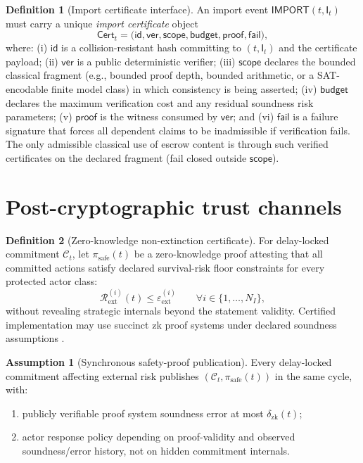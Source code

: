 \documentclass[11pt,a4paper]{article}
\newcommand{\eps}{\varepsilon}
\theoremstyle{definition}
\newtheorem{definition}{Definition}
\newtheorem{assumption}{Assumption}
\theoremstyle{remark}
\begin{document}
\begin{definition}[Import certificate interface]\label{def:import_certificate_interface}
An import event $\mathsf{IMPORT}(t,\mathsf I_t)$ must carry a unique \emph{import certificate} object
\[
\mathsf{Cert}_{t}=\big(\mathsf{id},\mathsf{ver},\mathsf{scope},\mathsf{budget},\mathsf{proof},\mathsf{fail}\big),
\]
where:
(i) $\mathsf{id}$ is a collision-resistant hash committing to $(t,\mathsf I_t)$ and the certificate payload;
(ii) $\mathsf{ver}$ is a public deterministic verifier;
(iii) $\mathsf{scope}$ declares the bounded classical fragment (e.g., bounded proof depth, bounded arithmetic, or a SAT-encodable finite model class) in which consistency is being asserted;
(iv) $\mathsf{budget}$ declares the maximum verification cost and any residual soundness risk parameters;
(v) $\mathsf{proof}$ is the witness consumed by $\mathsf{ver}$; and
(vi) $\mathsf{fail}$ is a failure signature that forces all dependent claims to be inadmissible if verification fails.
The only admissible classical use of escrow content is through such verified certificates on the declared fragment (fail closed outside $\mathsf{scope}$).
\end{definition}

\section{Post-cryptographic trust channels}
\begin{definition}[Zero-knowledge non-extinction certificate]\label{def:zero_knowledge_non_extinction_certificate}
For delay-locked commitment $\mathcal C_t$, let $\pi_{\mathrm{safe}}(t)$ be a zero-knowledge proof attesting that all committed actions satisfy declared survival-risk floor constraints for every protected actor class:
\[
\mathcal R_{\mathrm{ext}}^{(i)}(t)\le \eps_{\mathrm{ext}}^{(i)}\qquad \forall i\in\{1,\dots,N_I\},
\]
without revealing strategic internals beyond the statement validity.
Certified implementation may use succinct zk proof systems under declared soundness assumptions \cite{Groth2016}.
\end{definition}

\begin{assumption}[Synchronous safety-proof publication]\label{ass:zksafe}
Every delay-locked commitment affecting external risk publishes $(\mathcal C_t,\pi_{\mathrm{safe}}(t))$ in the same cycle, with:
\begin{enumerate}
  \item publicly verifiable proof system soundness error at most $\delta_{\mathrm{zk}}(t)$;
  \item actor response policy depending on proof-validity and observed soundness/error history, not on hidden commitment internals.
\end{enumerate}
\end{assumption}
\end{document}
